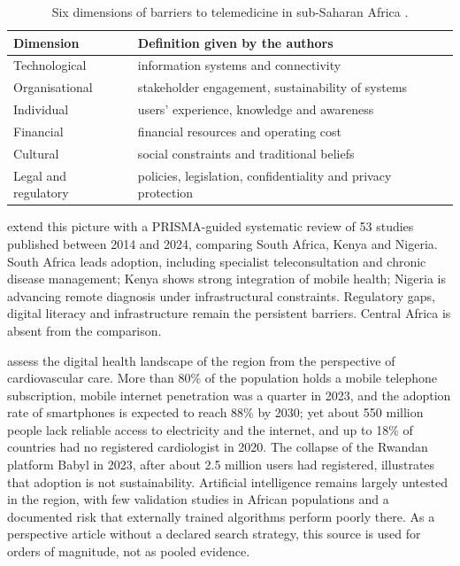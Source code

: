 \begin{table}[htbp]
\centering\small
\caption{Six dimensions of barriers to telemedicine in sub-Saharan Africa \parencite{dodoo2022}.}\label{tab:barriers}
\begin{tabularx}{\textwidth}{@{}>{\raggedright\arraybackslash}p{3.4cm} X@{}}
\toprule
\textbf{Dimension} & \textbf{Definition given by the authors} \\
\midrule
Technological & information systems and connectivity \\
Organisational & stakeholder engagement, sustainability of systems \\
Individual & users' experience, knowledge and awareness \\
Financial & financial resources and operating cost \\
Cultural & social constraints and traditional beliefs \\
Legal and regulatory & policies, legislation, confidentiality and privacy protection \\
\bottomrule
\end{tabularx}
\end{table}

\Textcite{agbeyangi2025} extend this picture with a PRISMA-guided systematic review of 53 studies published between 2014 and 2024, comparing South Africa, Kenya and Nigeria. South Africa leads adoption, including specialist teleconsultation and chronic disease management; Kenya shows strong integration of mobile health; Nigeria is advancing remote diagnosis under infrastructural constraints. Regulatory gaps, digital literacy and infrastructure remain the persistent barriers. Central Africa is absent from the comparison.

\Textcite{segun2025} assess the digital health landscape of the region from the perspective of cardiovascular care. More than 80\% of the population holds a mobile telephone subscription, mobile internet penetration was a quarter in 2023, and the adoption rate of smartphones is expected to reach 88\% by 2030; yet about 550 million people lack reliable access to electricity and the internet, and up to 18\% of countries had no registered cardiologist in 2020. The collapse of the Rwandan platform Babyl in 2023, after about 2.5 million users had registered, illustrates that adoption is not sustainability. Artificial intelligence remains largely untested in the region, with few validation studies in African populations and a documented risk that externally trained algorithms perform poorly there. As a perspective article without a declared search strategy, this source is used for orders of magnitude, not as pooled evidence.

